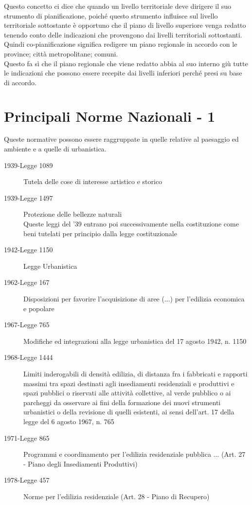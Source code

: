 \documentclass[a4paper,12pt, oneside]{book}
\begin{document}
Questo concetto ci dice che quando un livello territoriale deve dirigere il suo strumento di pianificazione, poiché questo strumento influisce sul livello territoriale sottostante è opportuno che il piano di livello superiore venga redatto tenendo conto delle indicazioni che provengono dai livelli territoriali sottostanti.\\
Quindi co-pianificazione significa redigere un piano regionale in accordo con le province; città metropolitane; comuni.\\
Questo fa sì che il piano regionale che viene redatto abbia al suo interno giù tutte le indicazioni che possono essere recepite dai livelli inferiori perché presi su base di accordo.\\
\section{Principali Norme Nazionali - 1}
Queste normative possono essere raggruppate in quelle relative al paesaggio ed ambiente e a quelle di urbanistica.\\
\begin{description}
	\item [1939-Legge 1089] Tutela delle cose di interesse artistico e storico
	\item [1939-Legge 1497] Protezione delle bellezze naturali
\\ Queste leggi del '39 entrano poi successivamente nella costituzione come beni tutelati per principio dalla legge costituzionale

	\item [1942-Legge 1150] Legge Urbanistica
	\item [1962-Legge  167] Disposizioni per favorire l'acquisizione di aree (...) per l'edilizia economica e popolare
	\item [1967-Legge  765] Modifiche ed integrazioni alla legge urbanistica del 17 agosto 1942, n. 1150
	\item [1968-Legge 1444] Limiti inderogabili di densità edilizia, di distanza fra i fabbricati e rapporti massimi tra spazi destinati agli insediamenti residenziali e produttivi e spazi pubblici o riservati alle attività collettive, al verde pubblico o ai parcheggi da osservare ai fini della formazione dei nuovi strumenti urbanistici o della revisione di quelli esistenti, ai sensi dell'art. 17 della legge del 6 agosto 1967, n. 765
	\item [1971-Legge  865] Programmi e coordinamento per l'edilizia residenziale pubblica ... (Art. 27 - Piano degli Insediamenti Produttivi)
	\item [1978-Legge  457] Norme per l'edilizia residenziale (Art. 28 - Piano di Recupero)
\end{description}
\end{document}
